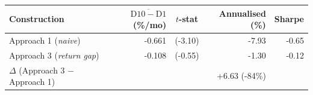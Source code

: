 \begin{tabular}{lrcrr}
\toprule
Construction & $\overline{\mathrm{D10}{-}\mathrm{D1}}$ (\%/mo) & $t$-stat & Annualised (\%) & Sharpe \\
\midrule
Approach 1 (\textit{naive}) & -0.661 & (-3.10) & -7.93 & -0.65 \\
Approach 3 (\textit{return gap}) & -0.108 & (-0.55) & -1.30 & -0.12 \\
\midrule
$\Delta$ (Approach 3 $-$ Approach 1) & & & +6.63 (-84\%) & 
\\
\bottomrule
\end{tabular}
